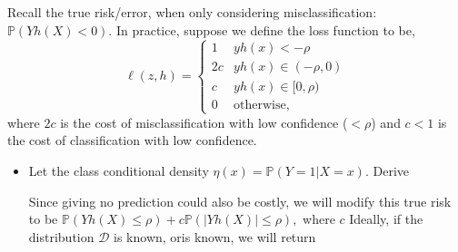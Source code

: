 \documentclass[12pt]{article}
\begin{document}
Recall the true risk/error, when only considering misclassification: $\mathbb{P}(Y h(X) < 0)$. In practice, suppose we define the loss function to be, 
\begin{equation}
	\ell(z, h) = \begin{cases}
		1 &  y h(x) < -\rho \\
		2c &  y h(x) \in (-\rho, 0) \\
		c & y h(x) \in [0, \rho) \\
		0 & \text{otherwise},
	\end{cases}
\end{equation}
where $2c$ is the cost of misclassification with low confidence ($<\rho$) and $c < 1$ is the cost of classification with low confidence. 
\begin{itemize}
\item[(a)] Let the class conditional density $\eta(x) = \mathbb{P}(Y = 1|X = x).$ Derive    

Since giving no prediction could also be costly, we will modify this true risk to be $\mathbb{P}(Y h(X) \leq \rho) + c \mathbb{P}(|Y h(X)| \leq \rho),$ where $c$
Ideally, if the distribution $\mathcal{D}$ is known, oris known, we will return 

\end{itemize}
\end{document}

